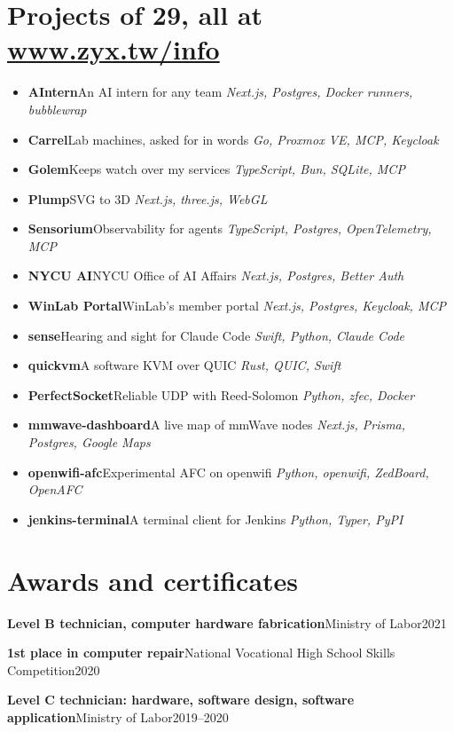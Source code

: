 \documentclass[10pt,a4paper]{article}
\begin{document}
\section{Projects\hfill{\small{} of 29, all at \href{https://www.zyx.tw/info\#projects}{www.zyx.tw/info}}}
\begin{itemize}[itemsep=0pt]
\item \textbf{AIntern}\quad An AI intern for any team \hfill {\small\itshape Next.js, Postgres, Docker runners, bubblewrap}
\item \textbf{Carrel}\quad Lab machines, asked for in words \hfill {\small\itshape Go, Proxmox VE, MCP, Keycloak}
\item \textbf{Golem}\quad Keeps watch over my services \hfill {\small\itshape TypeScript, Bun, SQLite, MCP}
\item \textbf{Plump}\quad SVG to 3D \hfill {\small\itshape Next.js, three.js, WebGL}
\item \textbf{Sensorium}\quad Observability for agents \hfill {\small\itshape TypeScript, Postgres, OpenTelemetry, MCP}
\item \textbf{NYCU AI}\quad NYCU Office of AI Affairs \hfill {\small\itshape Next.js, Postgres, Better Auth}
\item \textbf{WinLab Portal}\quad WinLab's member portal \hfill {\small\itshape Next.js, Postgres, Keycloak, MCP}
\item \textbf{sense}\quad Hearing and sight for Claude Code \hfill {\small\itshape Swift, Python, Claude Code}
\item \textbf{quickvm}\quad A software KVM over QUIC \hfill {\small\itshape Rust, QUIC, Swift}
\item \textbf{PerfectSocket}\quad Reliable UDP with Reed-Solomon \hfill {\small\itshape Python, zfec, Docker}
\item \textbf{mmwave-dashboard}\quad A live map of mmWave nodes \hfill {\small\itshape Next.js, Prisma, Postgres, Google Maps}
\item \textbf{openwifi-afc}\quad Experimental AFC on openwifi \hfill {\small\itshape Python, openwifi, ZedBoard, OpenAFC}
\item \textbf{jenkins-terminal}\quad A terminal client for Jenkins \hfill {\small\itshape Python, Typer, PyPI}
\end{itemize}

\section{Awards and certificates}
\textbf{Level B technician, computer hardware fabrication}\quad Ministry of Labor\hfill 2021\par\vspace{2pt}
\textbf{1st place in computer repair}\quad National Vocational High School Skills Competition\hfill 2020\par\vspace{2pt}
\textbf{Level C technician: hardware, software design, software application}\quad Ministry of Labor\hfill 2019--2020\par\vspace{2pt}
\end{document}
